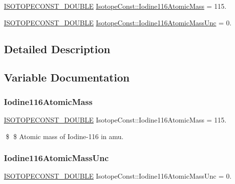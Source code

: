 \begin{DoxyCompactItemize}
\item 
\mbox{\hyperlink{group___isotope_const-_macros_ga8f45a7272ce02c0b4c65c44636ed719a}{I\+S\+O\+T\+O\+P\+E\+C\+O\+N\+S\+T\+\_\+\+D\+O\+U\+B\+LE}} \mbox{\hyperlink{group___isotope_const-_iodine-_i116_ga89b3c94fab92c74771375875758490d9}{Isotope\+Const\+::\+Iodine116\+Atomic\+Mass}} = 115.
\item 
\mbox{\hyperlink{group___isotope_const-_macros_ga8f45a7272ce02c0b4c65c44636ed719a}{I\+S\+O\+T\+O\+P\+E\+C\+O\+N\+S\+T\+\_\+\+D\+O\+U\+B\+LE}} \mbox{\hyperlink{group___isotope_const-_iodine-_i116_gab188c4591f21764c3ad606c278eca8de}{Isotope\+Const\+::\+Iodine116\+Atomic\+Mass\+Unc}} = 0.
\end{DoxyCompactItemize}


\subsection{Detailed Description}


\subsection{Variable Documentation}
\mbox{\label{group___isotope_const-_iodine-_i116_ga89b3c94fab92c74771375875758490d9}} 
\subsubsection{\texorpdfstring{Iodine116\+Atomic\+Mass}{Iodine116AtomicMass}}
{\footnotesize\ttfamily \mbox{\hyperlink{group___isotope_const-_macros_ga8f45a7272ce02c0b4c65c44636ed719a}{I\+S\+O\+T\+O\+P\+E\+C\+O\+N\+S\+T\+\_\+\+D\+O\+U\+B\+LE}} Isotope\+Const\+::\+Iodine116\+Atomic\+Mass = 115.}

\$ \$ Atomic mass of Iodine-\/116 in amu. \mbox{\label{group___isotope_const-_iodine-_i116_gab188c4591f21764c3ad606c278eca8de}} 
\subsubsection{\texorpdfstring{Iodine116\+Atomic\+Mass\+Unc}{Iodine116AtomicMassUnc}}
{\footnotesize\ttfamily \mbox{\hyperlink{group___isotope_const-_macros_ga8f45a7272ce02c0b4c65c44636ed719a}{I\+S\+O\+T\+O\+P\+E\+C\+O\+N\+S\+T\+\_\+\+D\+O\+U\+B\+LE}} Isotope\+Const\+::\+Iodine116\+Atomic\+Mass\+Unc = 0.}

